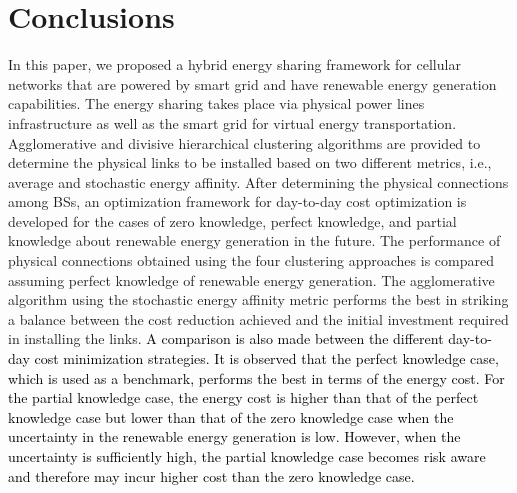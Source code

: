 \documentclass[10pt, letter,twocolumn]{IEEEtran}
\begin{document}
\section{Conclusions} \label{sec_conclusion}\vspace{-0.0cm}
In this paper, we proposed a hybrid energy sharing framework for cellular networks that are powered by smart grid and have renewable energy generation capabilities. The energy sharing takes place via physical power lines infrastructure as well as the smart grid for virtual energy transportation. Agglomerative and divisive hierarchical clustering algorithms are provided to determine the physical links to be installed based on two different metrics, i.e., average and stochastic energy affinity. After determining the physical connections among BSs, an optimization framework for day-to-day cost optimization is developed for the cases of zero knowledge, perfect knowledge, and partial knowledge about renewable energy generation in the future. The performance of physical connections obtained using the four clustering approaches is compared assuming perfect knowledge of renewable energy generation. The agglomerative algorithm using the stochastic energy affinity metric performs the best in striking a balance between the cost reduction achieved and the initial investment required in installing the links. \textcolor{black}{A comparison is also made between the different day-to-day cost minimization strategies. It is observed that the perfect knowledge case, which is used as a benchmark, performs the best in terms of the energy cost. For the partial knowledge case, the energy cost is higher than that of the perfect knowledge case but lower than that of the zero knowledge case when the uncertainty in the renewable energy generation is low. However, when the uncertainty is sufficiently high, the partial knowledge case becomes risk aware and therefore may incur higher cost than the zero knowledge case.}






\vspace{-0.0cm}

\end{document}
